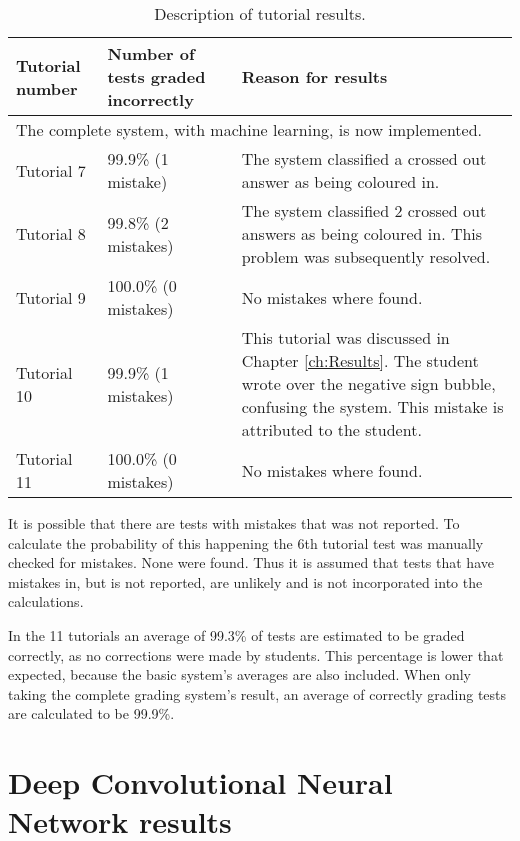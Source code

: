 \begin{table}
\caption{Description of tutorial results.} \label{tbl:tutResults2}
  \centering
\begin{tabular}{|p{2cm}|p{4cm}|p{5cm}|}
\hline
\textbf{Tutorial number}&\textbf{Number of tests graded incorrectly}&\textbf{Reason for results}\\
\hline
\multicolumn{3}{|l|}{The complete system,  with machine learning, is now implemented.}\\
\hline
Tutorial 7&99.9\% (1 mistake)&The system classified a crossed out answer as being coloured in.\\
\hline
Tutorial 8&99.8\% (2 mistakes)&The system classified 2 crossed out answers as being coloured in. This problem was subsequently resolved.\\
\hline
Tutorial 9&100.0\% (0 mistakes)&No mistakes where found.\\
\hline
Tutorial 10&99.9\% (1 mistakes)&This tutorial was discussed in Chapter \ref{ch:Results}. The student wrote over the negative sign bubble, confusing the system. This mistake is attributed to the student.\\
\hline
Tutorial 11&100.0\% (0 mistakes)&No mistakes where found.\\
\hline
\end{tabular}
\end{table}

It is possible that there are tests with mistakes that was not reported. To calculate the probability of this happening the 6th tutorial test was manually checked for mistakes. None were found. Thus it is assumed that tests that have mistakes in, but is not reported, are unlikely and is not incorporated into the calculations.

In the 11 tutorials an average of 99.3\% of tests are estimated to be graded correctly, as no corrections were made by students.  This percentage is lower that expected, because the basic system's averages are also included. When only taking the complete grading system's result, an average of correctly grading tests are calculated to be 99.9\%.


\section{Deep Convolutional Neural Network results}
\label{sec:DCNNresult}


